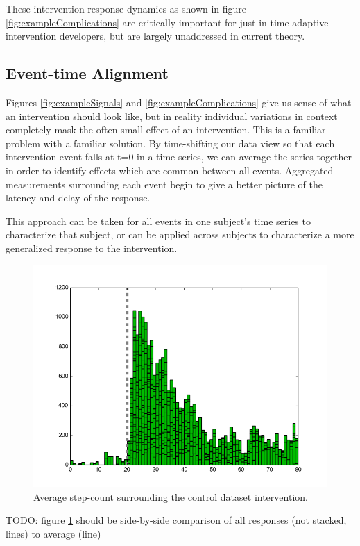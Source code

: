\documentclass[preprint,journal]{vgtc}       %
\begin{document}
These intervention response dynamics as shown in figure \ref{fig:exampleComplications} are critically important for just-in-time adaptive intervention developers, but are largely unaddressed in current theory.

\subsection{Event-time Alignment}
Figures \ref{fig:exampleSignals} and \ref{fig:exampleComplications} give us sense of what an intervention should look like, but in reality individual variations in context completely mask the often small effect of an intervention. 
This is a familiar problem with a familiar solution. 
By time-shifting our data view so that each intervention event falls at t=0 in a time-series, we can average the series together in order to identify effects which are common between all events.
Aggregated measurements surrounding each event begin to give a better picture of the latency and delay of the response.

This approach can be taken for all events in one subject's time series to characterize that subject, or can be applied across subjects to characterize a more generalized response to the intervention.

\begin{figure}
\centering
\includegraphics[width=0.9\columnwidth]{./img/perfect_intervention.png}
\caption{Average step-count surrounding the control dataset intervention.}
\label{fig:interventionAverage}
\end{figure}

TODO: figure \ref{fig:interventionAverage} should be side-by-side comparison of all responses (not stacked, lines) to average (line)
\end{document}
